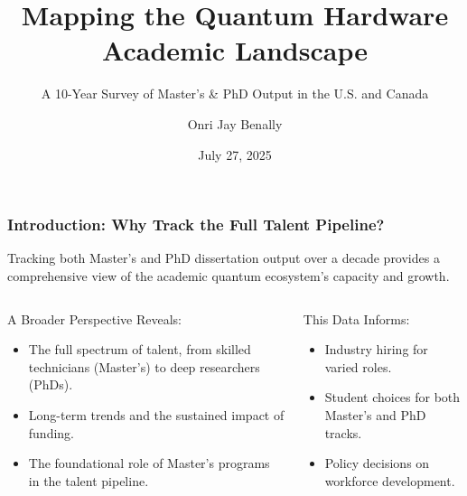 \documentclass[aspectratio=169]{beamer}
\title[Quantum Hardware Academic Landscape]{Mapping the Quantum Hardware Academic Landscape}
\subtitle{A 10-Year Survey of Master's \& PhD Output in the U.S. and Canada}
\author{Onri Jay Benally}
\institute{University of Minnesota-Twin Cities}
\date{July 27, 2025}
\begin{document}
\begin{frame}
    \titlepage
\end{frame}

\begin{frame}
    \frametitle{Introduction: Why Track the Full Talent Pipeline?}
    
    Tracking both Master's and PhD dissertation output over a decade provides a comprehensive view of the academic quantum ecosystem's capacity and growth.
    
    \begin{columns}[T]
        \begin{column}{0.5\textwidth}
            \begin{block}{A Broader Perspective Reveals:}
                \begin{itemize}
                    \item The full spectrum of talent, from skilled technicians (Master's) to deep researchers (PhDs).
                    \item Long-term trends and the sustained impact of funding.
                    \item The foundational role of Master's programs in the talent pipeline.
                \end{itemize}
            \end{block}
        \end{column}
        \begin{column}{0.5\textwidth}
            \begin{block}{This Data Informs:}
                \begin{itemize}
                    \item Industry hiring for varied roles.
                    \item Student choices for both Master's and PhD tracks.
                    \item Policy decisions on workforce development.
                \end{itemize}
            \end{block}
        \end{column}
    \end{columns}
\end{frame}
\end{document}
